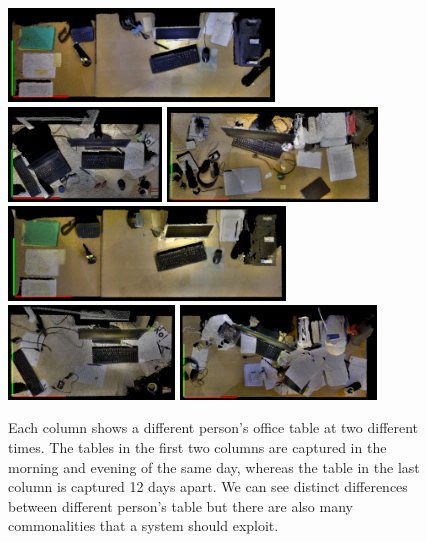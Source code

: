 \documentclass[letterpaper, 10 pt, conference]{ieeeconf}
\begin{document}
\begin{figure}[bhtp]
\begin{center}
\includegraphics[height=2.5cm]{David_Mor_131110} \quad
\includegraphics[height=2.5cm]{Nils_Mor_131111} \quad
\includegraphics[height=2.5cm]{Puren_Eve_131029}\\ \smallskip
\includegraphics[height=2.5cm]{David_Eve_131110} \enskip
\includegraphics[height=2.5cm]{Nils_Eve_131111} \enskip
\includegraphics[height=2.5cm]{Puren_Mor_131110}
\caption{Each column shows a different person's office table at two different times. The tables in the first two columns are captured in the morning and evening of the same day, whereas the table in the last column is captured 12 days apart. We can see distinct differences between different person's table but there are also many commonalities that a system should exploit.}
\label{fig:Example Scenes}
\end{center}
\end{figure}
\end{document}
